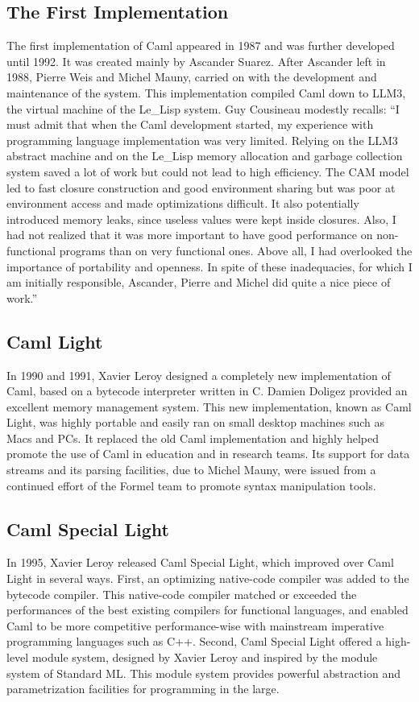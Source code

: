 \documentclass[14pt]{matmex-diploma-custom}
\begin{document}
\subsection{The First Implementation}
The first implementation of Caml appeared in 1987 and was further developed until 1992. It was created mainly by Ascander Suarez. After Ascander left in 1988, Pierre Weis and Michel Mauny, carried on with the development and maintenance of the system. This implementation compiled Caml down to LLM3,
the virtual machine of the Le\_Lisp system. Guy Cousineau modestly recalls: “I must admit that when the Caml development started, my experience with programming language implementation was very limited. Relying on the LLM3 abstract machine and on the Le\_Lisp memory allocation and garbage collection system saved a lot of work but could not lead to high efficiency. The CAM model led to fast closure construction and good environment sharing but was poor at environment access and made optimizations difficult. It also potentially introduced memory leaks, since useless values were kept inside closures. Also, I had not realized that it was more important to have good performance on non-functional programs than on very functional ones. Above all, I had overlooked the importance of portability and openness. In spite of these inadequacies, for which I am initially responsible, Ascander, Pierre and Michel did quite a nice piece of work.”
\subsection{Caml Light}
In 1990 and 1991, Xavier Leroy designed a completely new implementation of Caml, based on a bytecode interpreter written in C. Damien Doligez provided an excellent memory management system. This new implementation, known as Caml Light, was highly portable and easily ran on small desktop machines such as Macs and PCs. It replaced the old Caml implementation and highly helped promote the use of Caml in education and in research teams. Its support for data streams and its parsing facilities, due to Michel Mauny, were issued from a continued effort of the Formel team to promote syntax manipulation tools.
\subsection{Caml Special Light}
In 1995, Xavier Leroy released Caml Special Light, which improved over Caml Light in several ways. First, an optimizing native-code compiler was added to the bytecode compiler. This native-code compiler matched or exceeded the performances of the best existing compilers for functional languages, and enabled Caml to be more competitive performance-wise with mainstream imperative programming languages such as C++. Second, Caml Special Light offered a high-level module system, designed by Xavier Leroy and inspired by the module system of Standard ML. This module system provides powerful abstraction and parametrization facilities for programming in the large.
\end{document}
